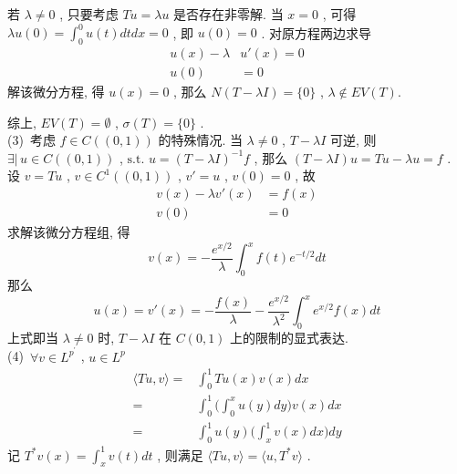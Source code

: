 \documentclass[a4paper, UTF8]{ctexart}				%
\numberwithin{equation}{section}				%
\begin{document}
        若 $\lambda \neq 0$ , 只要考虑 $Tu = \lambda u$ 是否存在非零解. 当 $x = 0$ , 可得 $\lambda u(0) = \int^0_0 u(t)dt dx = 0$ , 即 $u(0) = 0$ . 对原方程两边求导 
        \begin{equation*}
            \begin{split}
                u(x) - \lambda & u'(x) = 0\\
                u(0) & = 0
            \end{split}
        \end{equation*}
        解该微分方程, 得 $u(x) = 0$ , 那么 $N(T - \lambda I) = \{0\}$ , $\lambda \notin EV(T)$.
        
        综上, $EV(T) = \emptyset$ , $\sigma(T) = \{0\}$ .\\

        \noindent (3) \,考虑 $f \in C((0, 1))$ 的特殊情况. 当 $\lambda \neq 0$ , $T - \lambda I$ 可逆, 则 $\exists |\, u \in C((0, 1))$ , $\text{s.t. } u = (T - \lambda I)^{-1} f$ , 那么 $(T - \lambda I)u = Tu - \lambda u = f$ . 设 $v = T u$ , $v \in C^1((0, 1))$ , $v' = u$ , $v(0) = 0$ , 故 
        \begin{equation*}
            \begin{split}
                v(x) - \lambda v'(x) & = f(x)\\
                v(0) & = 0
            \end{split}
        \end{equation*}
         求解该微分方程组, 得 
         \[
             v(x) = -\frac{e^{x/2}}{\lambda} \int^x_0 f(t) e^{-t/2} dt
         \]
         那么 
         \[
             u(x) = v'(x) = -\frac{f(x)}{\lambda}-\frac{e^{x/2}}{\lambda^2}\int^x_0 e^{x/2} f(x) dt
         \]
         上式即当 $\lambda \neq 0$ 时, $T - \lambda I$ 在 $C(0, 1)$ 上的限制的显式表达.\\

         \noindent (4) \,$\forall v \in L^{p^{'}}$ , $u \in L^p$
         \begin{equation*}
             \begin{split}
                    \langle{Tu},{v}\rangle
                 =  & \int^1_0 Tu(x) v(x) dx\\
                 =  & \int^1_0 \Big( \int^x_0 u(y) dy \Big) v(x) dx\\
                 =  & \int^1_0 u(y) \Big( \int^1_x v(x) dx \Big) dy
             \end{split}
         \end{equation*}
         记 $T^*v(x) = \int^1_x v(t)dt$ , 则满足 $\langle{Tu},{v}\rangle = \langle{u},{T^*v}\rangle$ .
\end{document}
